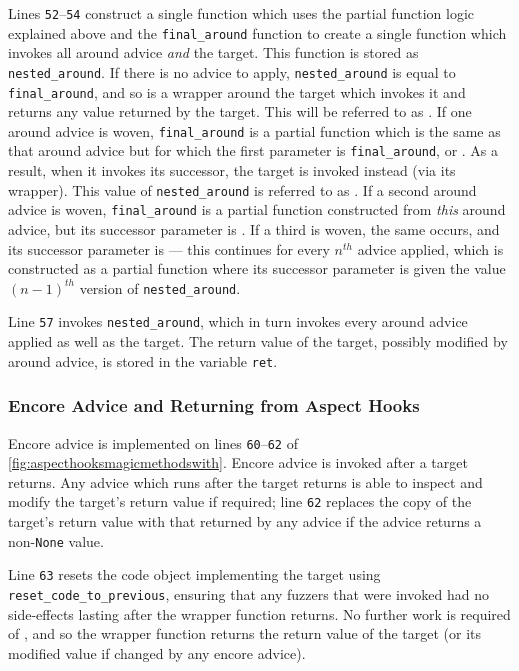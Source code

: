 Lines \texttt{52}--\texttt{54} construct a single function which uses the
partial function logic explained above and the \lstinline{final_around} function
to create a single function which invokes all around advice \emph{and} the
target. This function is stored as \lstinline{nested_around}. If there is no
advice to apply, \lstinline{nested_around} is equal to \lstinline{final_around},
and so is a wrapper around the target which invokes it and returns any value
returned by the target. This will be referred to as . If one around
advice is woven, \lstinline{final_around} is a partial function which is the
same as that around advice but for which the first parameter is
\lstinline{final_around}, or . As a result, when it invokes its
successor, the target is invoked instead (via its wrapper). This value of
\lstinline{nested_around} is referred to as . If a second around
advice is woven, \lstinline{final_around} is a partial function constructed from
\emph{this} around advice, but its successor parameter is . If a
third is woven, the same occurs, and its successor parameter is  ---
this continues for every $n^{th}$ advice applied, which is constructed as a
partial function where its successor parameter is given the value $(n-1)^{th}$
version of \lstinline{nested_around}.

Line \texttt{57} invokes \lstinline{nested_around}, which in turn invokes every
around advice applied as well as the target. The return value of the target,
possibly modified by around advice, is stored in the variable \lstinline{ret}.


\subsubsection{Encore Advice and Returning from Aspect Hooks}

Encore advice is implemented on lines \texttt{60}--\texttt{62} of
\cref{fig:aspecthooksmagicmethodswith}. Encore advice is invoked after a target
returns. Any advice which runs after the target returns is able to inspect and
modify the target's return value if required; line \texttt{62} replaces the copy
of the target's return value with that returned by any advice if the advice
returns a non-\lstinline{None} value.

Line \texttt{63} resets the code object implementing the target using
\lstinline{reset_code_to_previous}, ensuring that any fuzzers that were invoked
had no side-effects lasting after the wrapper function returns. No further work
is required of \pdsf{}, and so the wrapper function returns the return value of
the target (or its modified value if changed by any encore advice).


